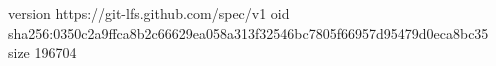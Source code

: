 version https://git-lfs.github.com/spec/v1
oid sha256:0350c2a9ffca8b2c66629ea058a313f32546bc7805f66957d95479d0eca8bc35
size 196704
